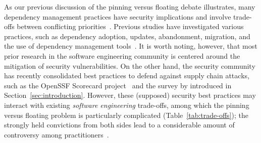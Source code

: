 As our previous discussion of the pinning versus floating debate illustrates, many dependency management practices have security implications and involve trade-offs between conflicting priorities~\cite{DBLP:conf/ccs/PashchenkoVM20}.
Previous studies have investigated various practices, such as dependency adoption, updates, abandonment, migration, and the use of dependency management tools~\cite[e.g.,][]{DBLP:journals/ese/KulaGOII18, DBLP:conf/sigsoft/VargasATBG20, DBLP:conf/sigsoft/HeHGZ21, DBLP:conf/sigsoft/MillerKV23, DBLP:journals/tse/HeHZZ23}.
It is worth noting, however, that most prior research in the software engineering community is centered around the mitigation of security vulnerabilities.
On the other hand, the security community has recently consolidated best practices to defend against supply chain attacks, such as the OpenSSF Scorecard project~\cite{DBLP:journals/ieeesp/ZahanKHSW23} and the survey by \citet{DBLP:conf/sp/LadisaPMB23} introduced in Section~\ref{sec:introduction}.
However, these (supposed) security best practices may interact with existing \emph{software engineering} trade-offs, among which the pinning versus floating problem is particularly complicated (Table~\ref{tab:trade-offs});  the strongly held convictions from both sides lead to a considerable amount of controversy among practitioners~\cite{facts-vs-feelings, renovate-discussion, pinning-only-work}.

